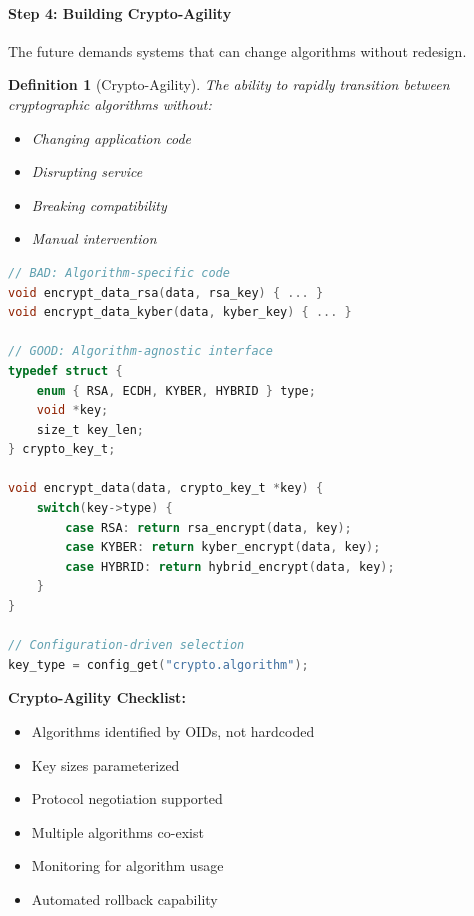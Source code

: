 \documentclass[11pt,a4paper]{article}
\newtheorem{definition}{Definition}
\begin{document}
\paragraph{Step 4: Building Crypto-Agility}

The future demands systems that can change algorithms without redesign.

\begin{definition}[Crypto-Agility]
The ability to rapidly transition between cryptographic algorithms without:
\begin{itemize}
    \item Changing application code
    \item Disrupting service
    \item Breaking compatibility
    \item Manual intervention
\end{itemize}
\end{definition}

\begin{lstlisting}[language=C, caption=Crypto-Agile Design Pattern]
// BAD: Algorithm-specific code
void encrypt_data_rsa(data, rsa_key) { ... }
void encrypt_data_kyber(data, kyber_key) { ... }

// GOOD: Algorithm-agnostic interface
typedef struct {
    enum { RSA, ECDH, KYBER, HYBRID } type;
    void *key;
    size_t key_len;
} crypto_key_t;

void encrypt_data(data, crypto_key_t *key) {
    switch(key->type) {
        case RSA: return rsa_encrypt(data, key);
        case KYBER: return kyber_encrypt(data, key);
        case HYBRID: return hybrid_encrypt(data, key);
    }
}

// Configuration-driven selection
key_type = config_get("crypto.algorithm");
\end{lstlisting}

\textbf{Crypto-Agility Checklist:}
\begin{itemize}
    \item \checkmark Algorithms identified by OIDs, not hardcoded
    \item \checkmark Key sizes parameterized
    \item \checkmark Protocol negotiation supported
    \item \checkmark Multiple algorithms co-exist
    \item \checkmark Monitoring for algorithm usage
    \item \checkmark Automated rollback capability
\end{itemize}
\end{document}

